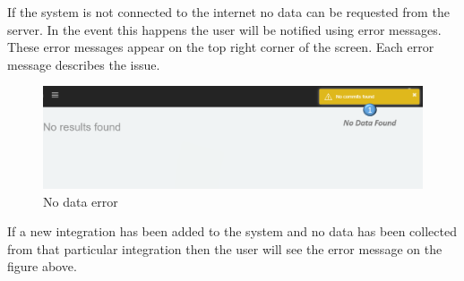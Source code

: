 \documentclass[11pt,a4paper]{article}
\begin{document}
If the system is not connected to the internet no data can be requested from the server. In the event this happens the user will be notified using error messages. These error messages appear on the top right corner of the screen. Each error message describes the issue.

\begin{figure}[H]
	\begin{center}
		\includegraphics[width=\linewidth]{../Images/Getting_Started/No_Data_Detailed_numbered}
		\caption{No data error}
	\end{center}
\end{figure}

If a new integration has been added to the system and no data has been collected from that particular integration then the user will see the error message on the figure above. \\ 
\end{document}
